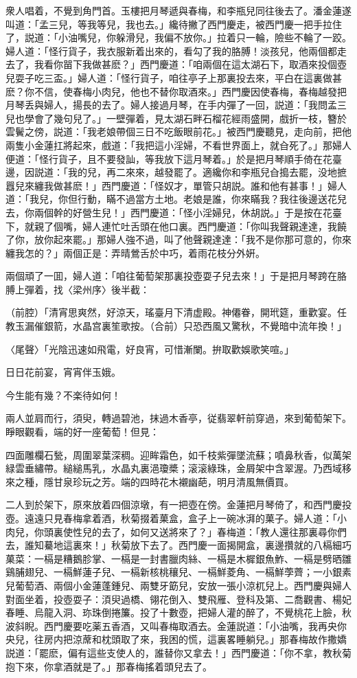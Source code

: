 衆人唱着，不覺到角門首。玉樓把月琴遞與春梅，和李瓶兒同往後去了。潘金蓮遂叫道：「孟三兒，等我等兒，我也去。」纔待撇了西門慶走，被西門慶一把手拉住了，説道：「小油嘴兒，你躲滑兒，我偏不放你。」拉着只一輪，險些不輪了一跤。婦人道：「怪行貨子，我衣服新着出來的，看勾了我的胳膊！淡孩兒，他兩個都走去了，我看你㽞下我做甚麽？」西門慶道：「咱兩個在這太湖石下，取酒來投個壺兒耍子吃三盃。」婦人道：「怪行貨子，咱往亭子上那裏投去來，平白在這裏做甚麽？你不信，使春梅小肉兒，他也不替你取酒來。」西門慶因使春梅，春梅越發把月琴丢與婦人，揚長的去了。婦人接過月琴，在手内彈了一回，説道：「我問孟三兒也學會了幾句兒了。」一壁彈着，見太湖石畔石榴花經雨盛開，戲折一枝，簪於雲鬢之傍，説道：「我老娘帶個三日不吃飯眼前花。」被西門慶聽見，走向前，把他兩隻小金蓮扛將起來，戲道：「我把這小淫婦，不看世界面上，就㒲死了。」那婦人便道：「怪行貨子，且不要發訕，等我放下這月琴着。」於是把月琴順手倚在花臺邊，因説道：「我的兒，再二來來，越發罷了。適纔你和李瓶兒㒲搗去罷，没地摭囂兒來纏我做甚麽！」西門慶道：「怪奴才，單管只胡説。誰和他有甚事！」婦人道：「我兒，你但行動，瞞不過當方土地。老娘是誰，你來瞞我？我往後邊送花兒去，你兩個幹的好營生兒！」西門慶道：「怪小淫婦兒，休胡説。」于是按在花臺下，就親了個嘴，婦人連忙吐舌頭在他口裏。西門慶道：「你叫我聲親達達，我饒了你，放你起來罷。」那婦人強不過，叫了他聲親達達：「我不是你那可意的，你來纏我怎的？」兩個正是：弄晴鶯舌於中巧，着雨花枝分外姸。

兩個頑了一囬，婦人道：「咱往葡萄架那裏投壺耍子兒去來！」于是把月琴跨在胳膊上彈着，找〈梁州序〉後半截：

（前腔）「清宵思爽然，好涼天，瑤臺月下清虚殿。神僊眷，開玳筵，重歡宴。任教玉漏催銀箭，水晶宫裏笙歌按。（合前）只恐西風又驚秋，不覺暗中流年換！」

〈尾聲〉「光陰迅速如飛電，好良宵，可惜漸闌。拚取歡娛歌笑喧。」

日日花前宴，宵宵伴玉娥。

今生能有幾？不楽待如何！　

兩人並肩而行，須臾，轉過碧池，抹過木香亭，従翡翠軒前穿過，來到葡萄架下。睜眼觀看，端的好一座葡萄！但見：

四面雕欄石甃，周圍翠葉深稠。迎眸霜色，如千枝紫彈墜流蘇；噴鼻秋香，似萬架緑雲垂繡帶。縋縋馬乳，水晶丸裏浥瓊槳；滚滚綠珠，金屑架中含翠渥。乃西域移來之種，隱甘泉珍玩之芳。端的四時花木襯幽葩，明月清風無價買。

二人到於架下，原來放着四個涼墩，有一把壺在傍。金蓮把月琴倚了，和西門慶投壺。遠遠只見春梅拿着酒，秋菊掇着菓盒，盒子上一碗冰湃的菓子。婦人道：「小肉兒，你頭裏使性兒的去了，如何又送將來了？」春梅道：「教人還往那裏尋你們去，誰知驀地這裏來！」秋菊放下去了。西門慶一面揭開盒，裏邊攢就的八槅細巧菓菜：一槅是糟鵝胗掌、一槅是一封書臘肉絲、一槅是木樨銀魚鮓、一槅是劈晒雛鷄脯翅兒、一槅鮮蓮子兒、一槅新核桃穰兒、一槅鮮菱角、一槅鮮荸薺；一小銀素兒葡萄酒、兩個小金蓮蓬鍾兒、兩雙牙筯兒，安放一張小涼杌兒上。西門慶與婦人對面坐着，投壺耍子：湏臾過橋、翎花倒入、雙飛雁、登科及第、二喬觀書、楊妃春睡、烏龍入洞、珎珠倒捲簾。投了十數壺，把婦人灌的醉了，不覺桃花上臉，秋波斜睨。西門慶要吃薬五香酒，又叫春梅取酒去。金蓮説道：「小油嘴，我再央你央兒，往房内把涼蓆和枕頭取了來，我困的慌，這裏畧睡躺兒。」那春梅故作撒嬌説道：「罷麽，偏有這些支使人的，誰替你又拿去！」西門慶道：「你不拿，教秋菊抱下來，你拿酒就是了。」那春梅搖着頭兒去了。

